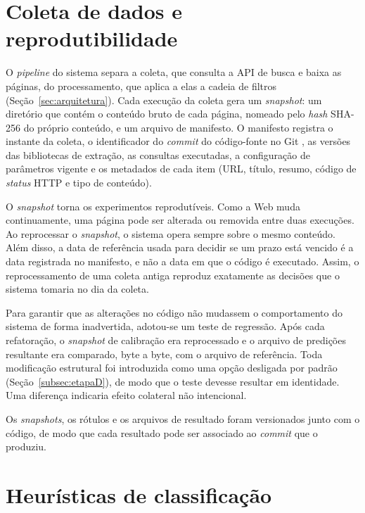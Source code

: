 \section{Coleta de dados e reprodutibilidade}
\label{sec:coleta}

O \textit{pipeline} do sistema separa a coleta, que consulta a API de busca e
baixa as páginas, do processamento, que aplica a elas a cadeia de filtros
(Seção~\ref{sec:arquitetura}). Cada execução da coleta gera um
\textit{snapshot}: um diretório que contém o
conteúdo bruto de cada página, nomeado pelo \textit{hash} SHA-256 do próprio
conteúdo, e um arquivo de manifesto. O manifesto registra o instante da coleta,
o identificador do \textit{commit} do código-fonte no Git \cite{git}, as versões
das bibliotecas de extração, as consultas executadas, a configuração de
parâmetros vigente e os metadados de cada item (URL, título, resumo, código de
\textit{status} HTTP e tipo de conteúdo).

O \textit{snapshot} torna os experimentos reprodutíveis. Como a Web muda
continuamente, uma página pode ser alterada ou removida entre duas execuções. Ao
reprocessar o \textit{snapshot}, o sistema opera sempre sobre o mesmo conteúdo.
Além disso, a data de referência usada para decidir se um prazo está vencido é
a data registrada no manifesto, e não a data em que o código é executado.
Assim, o reprocessamento de uma coleta antiga reproduz exatamente as decisões
que o sistema tomaria no dia da coleta.

Para garantir que as alterações no código não mudassem o comportamento do
sistema de forma inadvertida, adotou-se um teste de regressão. Após cada
refatoração, o \textit{snapshot} de calibração era reprocessado e o arquivo de
predições resultante era comparado, byte a byte, com o arquivo de referência.
Toda modificação estrutural foi introduzida como uma opção desligada por padrão
(Seção~\ref{subsec:etapaD}), de modo que o teste devesse resultar em
identidade. Uma diferença indicaria efeito colateral não intencional.

Os \textit{snapshots}, os rótulos e os arquivos de resultado foram versionados
junto com o código, de modo que cada resultado pode ser associado ao
\textit{commit} que o produziu.

\section{Heurísticas de classificação}
\label{sec:heuristicas}

